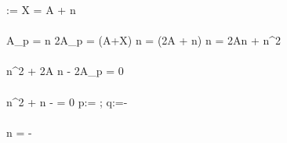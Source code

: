 ﻿\lambda :=  \qquad \Rightarrow \quad X = A + \lambda \cdot n \\ \\
A_p =  \cdot n \qquad \Leftrightarrow \quad 2A_p = (A+X) \cdot n = (2A + \lambda \cdot n) \cdot n = 2An + \lambda \cdot n^2 \\ \\
\lambda \cdot n^2 + 2A n - 2A_p = 0 \\ \\ 
n^2 +  \cdot n -  = 0 \qquad \bigg \rvert \quad p:=  \quad ; \quad q:=- \\ \\
n = - \pm {} \qquad \Rightarrow {}